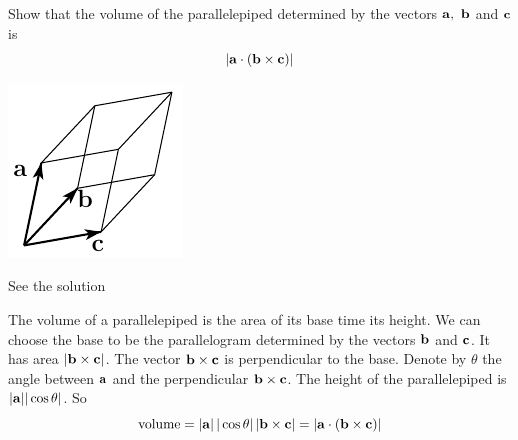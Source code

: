 \begin{question}
Show that the volume of the parallelepiped determined by the
vectors $\mathbf{a},\ \mathbf{b}$ and $\mathbf{c}$ is 
\begin{equation*}
    |\mathbf{a}\cdot(\mathbf{b}\times\mathbf{c})|
\end{equation*}

\begin{center}
     \includegraphics{fig/piped.pdf}
\end{center}

\end{question}


\begin{answer}
See the solution
\end{answer}

\begin{solution}
The volume of a parallelepiped is the area of its
base time its height. We can choose the base to be the parallelogram 
determined by the vectors $\mathbf{b}$ and $\mathbf{c}$. It has area $|\mathbf{b}\times\mathbf{c}|$.
The vector $\mathbf{b}\times\mathbf{c}$ is perpendicular to the base. 
%
Denote by
$\theta$ the angle between $\mathbf{a}$ and the perpendicular $\mathbf{b}\times\mathbf{c}$.
The height of the parallelepiped is $|\mathbf{a}| |\cos\theta|$. So 
\begin{equation*}
\text{volume} = |\mathbf{a}|\, |\cos\theta|\, |\mathbf{b}\times\mathbf{c}|
=|\mathbf{a}\cdot(\mathbf{b}\times\mathbf{c})|
\end{equation*}
\end{solution}

